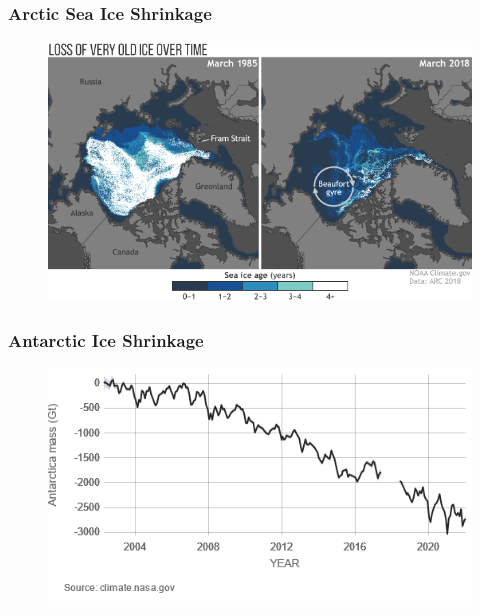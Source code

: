 \documentclass[handout]{beamer}
\begin{document}
\begin{frame} 
	\frametitle{\LARGE{Arctic Sea Ice Shrinkage}}
	\begin{figure}[ht!]
		\centering
		\includegraphics[width=\textwidth,height=0.8\textheight, keepaspectratio]{arctic_sea_ice.png}
	\end{figure}
\end{frame}

\begin{frame} 
	\frametitle{\LARGE{Antarctic Ice Shrinkage}}
	\begin{figure}[ht!]
		\centering
		\includegraphics[width=\textwidth,height=0.8\textheight,keepaspectratio]{LandIceAntarctica.png}
	\end{figure}
\end{frame}
\end{document}
